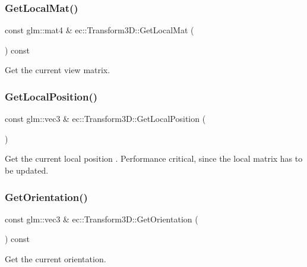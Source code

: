 \subsubsection{\texorpdfstring{Get\+Local\+Mat()}{GetLocalMat()}}
{\footnotesize\ttfamily const glm\+::mat4 \& ec\+::\+Transform3\+D\+::\+Get\+Local\+Mat (\begin{DoxyParamCaption}{ }\end{DoxyParamCaption}) const}

Get the current view matrix. \mbox{\label{classec_1_1_transform3_d_a69a9688cbe54695c5798eb532b7f1a30}} 
\subsubsection{\texorpdfstring{Get\+Local\+Position()}{GetLocalPosition()}}
{\footnotesize\ttfamily const glm\+::vec3 \& ec\+::\+Transform3\+D\+::\+Get\+Local\+Position (\begin{DoxyParamCaption}{ }\end{DoxyParamCaption})}

Get the current local position . Performance critical, since the local matrix has to be updated. \mbox{\label{classec_1_1_transform3_d_a84ad94cea6d167aedfc640bcf1165ea7}} 
\subsubsection{\texorpdfstring{Get\+Orientation()}{GetOrientation()}}
{\footnotesize\ttfamily const glm\+::vec3 \& ec\+::\+Transform3\+D\+::\+Get\+Orientation (\begin{DoxyParamCaption}{ }\end{DoxyParamCaption}) const}

Get the current orientation. \mbox{\label{classec_1_1_transform3_d_a8819e33e87e8a8cf0086c156b0072a4d}} 
